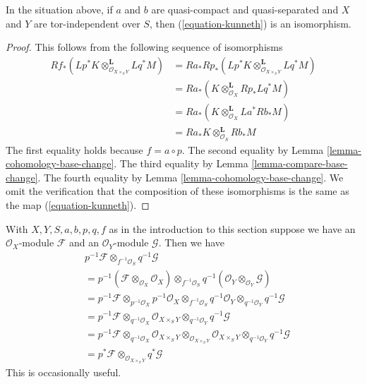 \begin{lemma}
\label{lemma-kunneth}
In the situation above, if $a$ and $b$ are quasi-compact and quasi-separated
and $X$ and $Y$ are tor-independent over $S$, then (\ref{equation-kunneth})
is an isomorphism.
\end{lemma}

\begin{proof}
This follows from the following sequence of isomorphisms
\begin{align*}
Rf_*(Lp^*K \otimes_{\mathcal{O}_{X \times_S Y}}^\mathbf{L} Lq^*M)
& =
Ra_*Rp_*(Lp^*K \otimes_{\mathcal{O}_{X \times_S Y}}^\mathbf{L} Lq^*M) \\
& =
Ra_*(K \otimes_{\mathcal{O}_X}^\mathbf{L} Rp_*Lq^*M) \\
& =
Ra_*(K \otimes_{\mathcal{O}_X}^\mathbf{L} La^*Rb_*M) \\
& =
Ra_*K \otimes_{\mathcal{O}_S}^\mathbf{L} Rb_*M
\end{align*}
The first equality holds because $f = a \circ p$. The second equality
by Lemma \ref{lemma-cohomology-base-change}. The third equality by
Lemma \ref{lemma-compare-base-change}.  The fourth equality by
Lemma \ref{lemma-cohomology-base-change}.
We omit the verification that the composition of these isomorphisms
is the same as the map (\ref{equation-kunneth}).
\end{proof}

\begin{remark}
\label{remark-silly}
With $X, Y, S, a, b, p, q, f$ as in the introduction to this section
suppose we have an $\mathcal{O}_X$-module $\mathcal{F}$ and an
$\mathcal{O}_Y$-module $\mathcal{G}$. Then we have
\begin{align*}
& p^{-1}\mathcal{F} \otimes_{f^{-1}\mathcal{O}_S} q^{-1}\mathcal{G} \\
& =
p^{-1}(\mathcal{F} \otimes_{\mathcal{O}_X} \mathcal{O}_X)
\otimes_{f^{-1}\mathcal{O}_S}
q^{-1}(\mathcal{O}_Y \otimes_{\mathcal{O}_Y} \mathcal{G}) \\
& =
p^{-1}\mathcal{F} \otimes_{p^{-1}\mathcal{O}_X} p^{-1}\mathcal{O}_X
\otimes_{f^{-1}\mathcal{O}_S}
q^{-1}\mathcal{O}_Y \otimes_{q^{-1}\mathcal{O}_Y} q^{-1}\mathcal{G} \\
& =
p^{-1}\mathcal{F} \otimes_{q^{-1}\mathcal{O}_X}
\mathcal{O}_{X \times_S Y}
\otimes_{q^{-1}\mathcal{O}_Y} q^{-1}\mathcal{G}  \\
& =
p^{-1}\mathcal{F} \otimes_{q^{-1}\mathcal{O}_X}
\mathcal{O}_{X \times_S Y}
\otimes_{\mathcal{O}_{X \times_S Y}}
\mathcal{O}_{X \times_S Y}
\otimes_{q^{-1}\mathcal{O}_Y} q^{-1}\mathcal{G}  \\
& =
p^*\mathcal{F} \otimes_{\mathcal{O}_{X \times_S Y}} q^*\mathcal{G}
\end{align*}
This is occasionally useful.
\end{remark}

